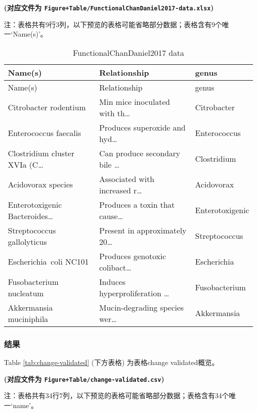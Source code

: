 \documentclass[
]{article}
\begin{document}
\textbf{(对应文件为 \texttt{Figure+Table/FunctionalChanDaniel2017-data.xlsx})}

\begin{center}\begin{tcolorbox}[colback=gray!10, colframe=gray!50, width=0.9\linewidth, arc=1mm, boxrule=0.5pt]注：表格共有9行3列，以下预览的表格可能省略部分数据；表格含有9个唯一`Name(s)'。
\end{tcolorbox}
\end{center}

\begin{longtable}[]{@{}lll@{}}
\caption{\label{tab:FunctionalChanDaniel2017-data}FunctionalChanDaniel2017 data}\tabularnewline
\toprule
Name(s) & Relationship & genus\tabularnewline
\midrule
\endfirsthead
\toprule
Name(s) & Relationship & genus\tabularnewline
\midrule
\endhead
Citrobacter rodentium & Min mice inoculated with th\ldots{} & Citrobacter\tabularnewline
Enterococcus faecalis & Produces superoxide and hyd\ldots{} & Enterococcus\tabularnewline
Clostridium cluster XVIa (C\ldots{} & Can produce secondary bile \ldots{} & Clostridium\tabularnewline
Acidovorax species & Associated with increased r\ldots{} & Acidovorax\tabularnewline
Enterotoxigenic Bacteroides\ldots{} & Produces a toxin that cause\ldots{} & Enterotoxigenic\tabularnewline
Streptococcus gallolyticus & Present in approximately 20\ldots{} & Streptococcus\tabularnewline
Escherichia~coli NC101 & Produces genotoxic colibact\ldots{} & Escherichia\tabularnewline
Fusobacterium nucleatum & Induces hyperproliferation \ldots{} & Fusobacterium\tabularnewline
Akkermansia muciniphila & Mucin-degrading species wer\ldots{} & Akkermansia\tabularnewline
\bottomrule
\end{longtable}

\hypertarget{ux7ed3ux679c}{%
\subsubsection{结果}\label{ux7ed3ux679c}}

Table \ref{tab:change-validated} (下方表格) 为表格change validated概览。

\textbf{(对应文件为 \texttt{Figure+Table/change-validated.csv})}

\begin{center}\begin{tcolorbox}[colback=gray!10, colframe=gray!50, width=0.9\linewidth, arc=1mm, boxrule=0.5pt]注：表格共有34行7列，以下预览的表格可能省略部分数据；表格含有34个唯一`name'。
\end{tcolorbox}
\end{center}
\end{document}
